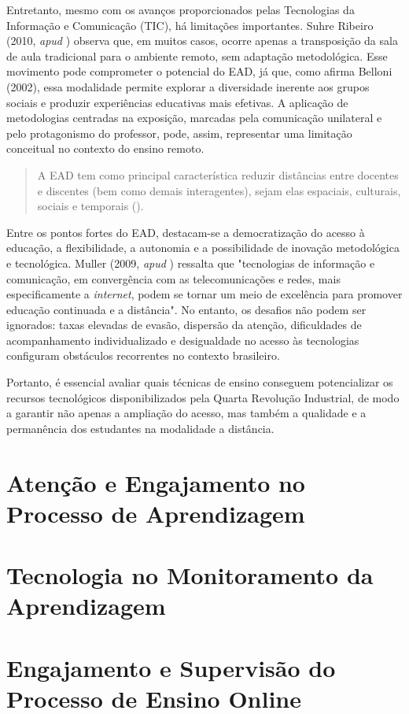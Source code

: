 Entretanto, mesmo com os avanços proporcionados pelas Tecnologias da Informação e Comunicação (TIC), há limitações importantes. Suhre Ribeiro (2010, \textit{apud} \cite{schneiderSalaAulaInvertida2013}) observa que, em muitos casos, ocorre apenas a transposição da sala de aula tradicional para o ambiente remoto, sem adaptação metodológica. Esse movimento pode comprometer o potencial do EAD, já que, como afirma Belloni (2002)\cite{belloniEnsaioSobreEducacao2002}, essa modalidade permite explorar a diversidade inerente aos grupos sociais e produzir experiências educativas mais efetivas. A aplicação de metodologias centradas na exposição, marcadas pela comunicação unilateral e pelo protagonismo do professor, pode, assim, representar uma limitação conceitual no contexto do ensino remoto.

\begin{quote}
A EAD tem como principal característica reduzir distâncias entre docentes e discentes (bem como demais interagentes), sejam elas espaciais, culturais, sociais e temporais (\cite{belloniEnsaioSobreEducacao2002}).
\end{quote}

Entre os pontos fortes do EAD, destacam-se a democratização do acesso à educação, a flexibilidade, a autonomia e a possibilidade de inovação metodológica e tecnológica. Muller (2009, \textit{apud} \cite{vasconcelosEstrategiasEnsinoAplicaveis2013}) ressalta que "tecnologias de informação e comunicação, em convergência com as telecomunicações e redes, mais especificamente a \textit{internet}, podem se tornar um meio de excelência para promover educação continuada e a distância". No entanto, os desafios não podem ser ignorados: taxas elevadas de evasão, dispersão da atenção, dificuldades de acompanhamento individualizado e desigualdade no acesso às tecnologias configuram obstáculos recorrentes no contexto brasileiro.

Portanto, é essencial avaliar quais técnicas de ensino conseguem potencializar os recursos tecnológicos disponibilizados pela Quarta Revolução Industrial, de modo a garantir não apenas a ampliação do acesso, mas também a qualidade e a permanência dos estudantes na modalidade a distância.


\section{Atenção e Engajamento no Processo de Aprendizagem}

\section{Tecnologia no Monitoramento da Aprendizagem}

\section{Engajamento e Supervisão do Processo de Ensino Online}